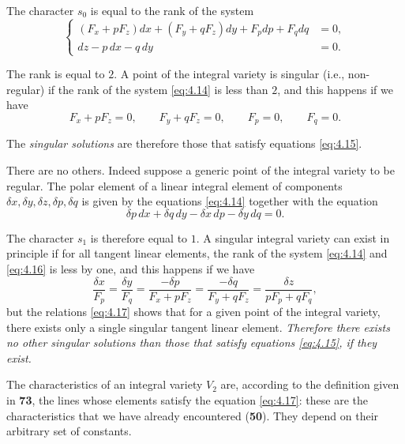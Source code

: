 \documentclass[leqno,11pt]{book}
\numberwithin{equation}{chapter}
\theoremstyle{shape1}
\theoremstyle{shape0}
\theoremstyle{shape2}
\theoremstyle{definition}
\begin{document}
The character $s_{0}$ is equal to the rank of the system
\begin{equation}
  \label{eq:4.14}
  \left\{
    \begin{aligned}
      (F_{x}+pF_{z})dx+(F_{y}+qF_{z})dy+F_{p}dp+F_{q}dq&=0,\\
      dz-p\,dx-q\,dy&=0.
    \end{aligned}
  \right.
\end{equation}

The rank is equal to $2$. A point of the integral variety is singular ({i.e.}, non-regular) if the rank of the system \eqref{eq:4.14} is less than $2$, and this happens if we have
\begin{equation}
  \label{eq:4.15}
  F_{x}+pF_{z}=0,\qquad F_{y}+qF_{z}=0,\qquad F_{p}=0,\qquad F_{q}=0.
\end{equation}

The \emph{singular solutions} are therefore those that satisfy equations \eqref{eq:4.15}.

There are no others. Indeed suppose a generic point of the integral variety to be regular. The polar element of a linear integral element of components $\delta x,\delta y, \delta z, \delta p, \delta q$ is given by the equations \eqref{eq:4.14} together with the equation
\begin{equation}
  \label{eq:4.16}
  \delta p\,dx+\delta q\,dy-\delta x\,dp-\delta y\,dq=0.
\end{equation}

The character $s_{1}$ is therefore equal to $1$. A singular integral variety can exist in principle if for all tangent linear elements, the rank of the system \eqref{eq:4.14} and \eqref{eq:4.16} is less by one, and this happens if we have
\begin{equation}
  \label{eq:4.17}
  \frac{\delta x}{F_{p}}=\frac{\delta y}{F_{q}}=\frac{-\delta p}{F_{x}+pF_{z}}=\frac{-\delta q}{F_{y}+q F_{z}}=\frac{\delta z}{p F_{p}+qF_{q}},
\end{equation}
but the relations \eqref{eq:4.17} shows that for a given point of the integral variety, there exists only a single singular tangent linear element. \emph{Therefore there exists no other singular solutions than those that satisfy equations \eqref{eq:4.15}, if they exist.}

The characteristics of an integral variety $V_{2}$ are, according to the definition given in \textsection\textbf{73}, the lines whose elements satisfy the equation \eqref{eq:4.17}: these are the characteristics that we have already encountered (\textsection\textbf{50}). They depend on their arbitrary set of constants.
\end{document}
